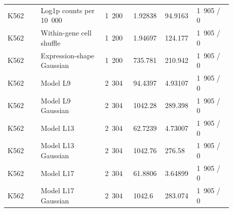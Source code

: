 \begin{longtable}{@{}L{0.14\linewidth}L{0.27\linewidth}L{0.12\linewidth}L{0.1\linewidth}L{0.1\linewidth}L{0.15\linewidth}@{}}
K562 & Log1p counts per 10~000 & 1~200 & 1.92838 & 94.9163 & 1~905 / 0 \\
K562 & Within-gene cell shuffle & 1~200 & 1.94697 & 124.177 & 1~905 / 0 \\
K562 & Expression-shape Gaussian & 1~200 & 735.781 & 210.942 & 1~905 / 0 \\
K562 & Model L9 & 2~304 & 94.4397 & 4.93107 & 1~905 / 0 \\
K562 & Model L9 Gaussian & 2~304 & 1042.28 & 289.398 & 1~905 / 0 \\
K562 & Model L13 & 2~304 & 62.7239 & 4.73007 & 1~905 / 0 \\
K562 & Model L13 Gaussian & 2~304 & 1042.76 & 276.58 & 1~905 / 0 \\
K562 & Model L17 & 2~304 & 61.8806 & 3.64899 & 1~905 / 0 \\
K562 & Model L17 Gaussian & 2~304 & 1042.6 & 283.074 & 1~905 / 0 \\
\end{longtable}
